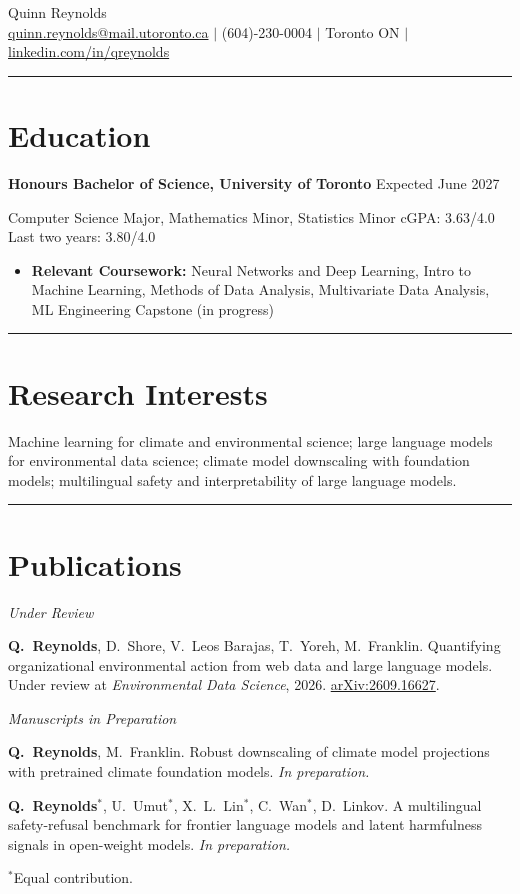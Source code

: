 \documentclass[11pt,letterpaper]{article}
\newcommand{\me}{\textbf{Q.~Reynolds}}   %
\let\oldsection\section
\renewcommand{\section}[1]{\par\needspace{6\baselineskip}\vspace{4pt}\noindent\rule{\textwidth}{0.4pt}\par\oldsection*{#1}}
\newcommand{\subhead}[1]{\par\vspace{3pt}\textit{#1}\par\vspace{1pt}}
\newcommand{\entry}[2]{\textbf{#1} \hfill #2\par}
\begin{document}
\begin{center}
  {\LARGE Quinn Reynolds}\\[3pt]
  \href{mailto:quinn.reynolds@mail.utoronto.ca}{quinn.reynolds@mail.utoronto.ca} $|$
  (604)-230-0004 $|$ Toronto ON $|$
  \href{https://www.linkedin.com/in/qreynolds/}{linkedin.com/in/qreynolds}
\end{center}

\section{Education}
\entry{Honours Bachelor of Science, University of Toronto}{Expected June 2027}
Computer Science Major, Mathematics Minor, Statistics Minor \hfill cGPA: 3.63/4.0 \quad Last two years: 3.80/4.0
\begin{itemize}
  \item \textbf{Relevant Coursework:} Neural Networks and Deep Learning, Intro to Machine Learning, Methods of Data Analysis, Multivariate Data Analysis, ML Engineering Capstone (in progress)
\end{itemize}

\section{Research Interests}
Machine learning for climate and environmental science; large language models for environmental data science; climate model downscaling with foundation models;
multilingual safety and interpretability of large language models.

\section{Publications}

\subhead{Under Review}
\begin{pubs}
  \item \me, D.~Shore, V.~Leos Barajas, T.~Yoreh, M.~Franklin.
        Quantifying organizational environmental action from web data and large language models.
        Under review at \textit{Environmental Data Science}, 2026.
        \href{https://arxiv.org/abs/2609.16627}{arXiv:2609.16627}.
\end{pubs}

\subhead{Manuscripts in Preparation}
\begin{pubs}[resume]
  \item \me, M.~Franklin.
        Robust downscaling of climate model projections with pretrained climate foundation models.
        \textit{In preparation.}
  \item \me$^{*}$, U.~Umut$^{*}$, X.~L.~Lin$^{*}$, C.~Wan$^{*}$, D.~Linkov.
        A multilingual safety-refusal benchmark for frontier language models and latent harmfulness signals in open-weight models.
        \textit{In preparation.}
\end{pubs}
{\small $^{*}$Equal contribution.}
\end{document}
